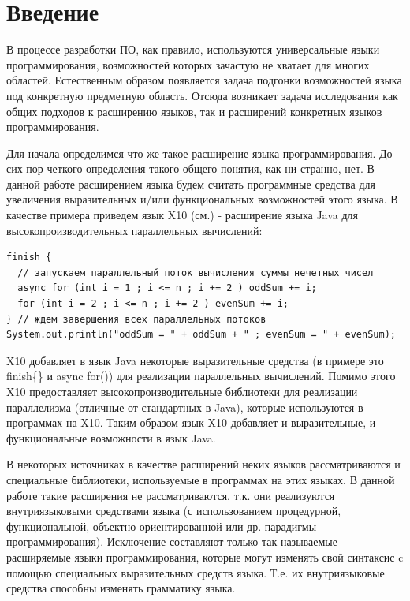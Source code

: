 \documentclass[a4paper,12pt,titlepage]{extarticle}
\begin{document}
\setcounter{page}{3}
\renewcommand{\contentsname}{Оглавление}
\tableofcontents

\pagebreak

\section{Введение}

В процессе разработки ПО, как правило, используются универсальные языки
программирования, возможностей которых зачастую не хватает для многих областей.
Естественным образом появляется задача подгонки возможностей языка под
конкретную предметную область. Отсюда возникает задача исследования как общих
подходов к расширению языков, так и расширений конкретных языков
программирования.

Для начала определимся что же такое расширение языка программирования. До сих
пор четкого определения такого общего понятия, как ни странно, нет. В данной
работе расширением языка будем считать программные средства для увеличения
выразительных и/или функциональных возможностей этого языка. В
качестве примера приведем язык X10 (см.\cite{x10}) - расширение языка Java для
высокопроизводительных параллельных вычислений:
\begin{verbatim}
finish {
  // запускаем параллельный поток вычисления суммы нечетных чисел
  async for (int i = 1 ; i <= n ; i += 2 ) oddSum += i;
  for (int i = 2 ; i <= n ; i += 2 ) evenSum += i;
} // ждем завершения всех параллельных потоков
System.out.println("oddSum = " + oddSum + " ; evenSum = " + evenSum);
\end{verbatim}
X10 добавляет в язык Java некоторые выразительные средства (в
примере это finish\{\} и async for()) для реализации параллельных вычислений.
Помимо этого X10 предоставляет высокопроизводительные библиотеки для реализации
параллелизма (отличные от стандартных в Java), которые используются в
программах на X10. Таким образом язык X10 добавляет и выразительные, и
функциональные возможности в язык Java.

В некоторых источниках в качестве расширений неких языков рассматриваются и
специальные библиотеки, используемые в программах на этих языках. В данной
работе такие расширения не рассматриваются, т.к. они реализуются внутриязыковыми средствами
языка (с использованием процедурной, функциональной, объектно-ориентированной
или др. парадигмы программирования).
Исключение составляют только так называемые расширяемые языки программирования,
которые могут изменять свой синтаксис c помощью специальных выразительных
средств языка. Т.е. их внутриязыковые средства способны изменять грамматику
языка.
\end{document}
